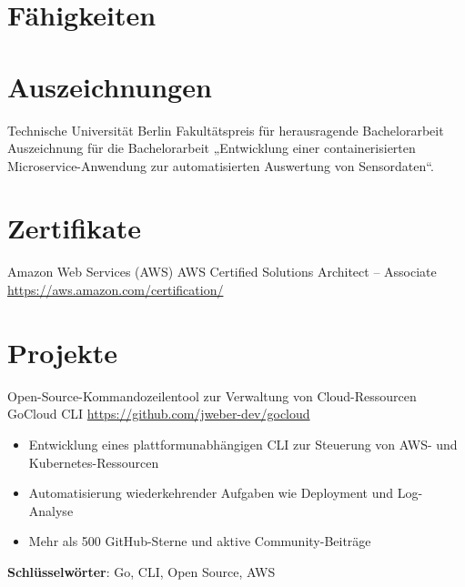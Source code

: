 \documentclass[a4paper, serif, 10pt]{moderncv}
\begin{document}
\section{Fähigkeiten}

\section{Auszeichnungen}

        {Technische Universität Berlin}
        {Fakultätspreis für herausragende Bachelorarbeit}
        {}
        {}
        {Auszeichnung für die Bachelorarbeit „Entwicklung einer containerisierten Microservice-Anwendung zur automatisierten Auswertung von Sensordaten“.}
\section{Zertifikate}

        {Amazon Web Services (AWS)}
        {AWS Certified Solutions Architect – Associate}
        {\url{https://aws.amazon.com/certification/}}
        {}
        {}
\section{Projekte}

        {Open-Source-Kommandozeilentool zur Verwaltung von Cloud-Ressourcen}
        {GoCloud CLI}
        {\url{https://github.com/jweber-dev/gocloud}}
        {}
        {\begin{itemize}
\item Entwicklung eines plattformunabhängigen CLI zur Steuerung von AWS- und Kubernetes-Ressourcen
\item Automatisierung wiederkehrender Aufgaben wie Deployment und Log-Analyse
\item Mehr als 500 GitHub-Sterne und aktive Community-Beiträge
\end{itemize}
\textbf{Schlüsselwörter}: Go, CLI, Open Source, AWS}
\end{document}
